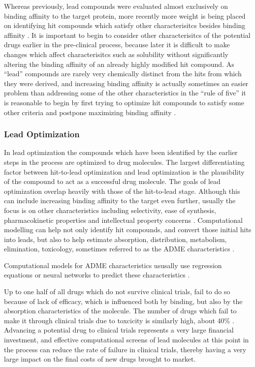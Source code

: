 Whereas previously, lead compounds were evaluated almost exclusively on binding affinity to the target protein, more recently more weight is being placed on identifying hit compounds which satisfy other characterisitcs besides binding affinity \cite{bleicher2003hit}.
It is important to begin to consider other characterisitcs of the potential drugs earlier in the pre-clinical process, because later it is difficult to make changes which affect characterisitcs such as solubility without significantly altering the binding affinity of an already highly modified hit compound.
As ``lead'' compounds are rarely very chemically distinct from the hits from which they were derived, and increasing binding affinity is actually sometimes an easier problem than addressing some of the other characteristics in the ``rule of five'' it is reasonable to begin by first trying to optimize hit compounds to satisfy some other criteria and postpone maximizing binding affinity \cite{proudfoot2002drugs}.

\subsubsection{Lead Optimization}
\label{subsubsection:lead_optimization}
In lead optimization the compounds which have been identified by the earlier steps in the process are optimized to drug molecules.
The largest differentiating factor between hit-to-lead optimization and lead optimization is the plausibility of the compound to act as a successful drug molecule.
The goals of lead optimization overlap heavily with those of the hit-to-lead stage.
Although this can include increasing binding affinity to the target even further, usually the focus is on other characteristics including selectivity, ease of synthesis, pharmacokinetic properties and intellectual property concerns \cite{keserHu2006hit}.
Computational modelling can help not only identify hit compounds, and convert those initial hits into leads, but also to help estimate absorption, distribution, metabolism, elimination, toxicology, sometimes referred to as the ADME characteristics \cite{kerns2008drug}.

Computational models for ADME characteristics ususally use regression equations or neural networks to predict these characteristics \cite{jorgensen2004many}.

Up to one half of all drugs which do not survive clinical trials, fail to do so because of lack of efficacy, which is influenced both by binding, but also by the absorption characteristics of the molecule.
The number of drugs which fail to make it through clinical trials due to toxcicity is similarly high, about 40\% \cite{li2001screening}.
Advancing a potential drug to clinical trials represents a very large financial investment, and effective computational screens of lead molecules at this point in the process can reduce the rate of failure in clinical trials, thereby having a very large impact on the final costs of new drugs brought to market.
